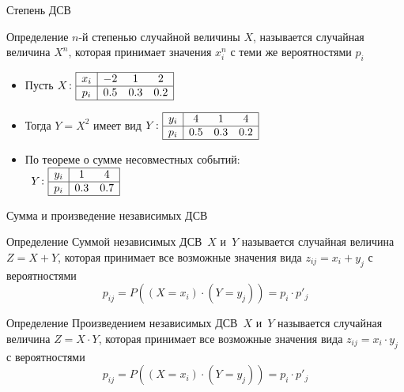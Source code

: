 \documentclass[unicode,11pt,notheorems,xcolor=table]{beamer}
\begin{document}
\begin{frame}{Степень  ДСВ}{}
    
    
     \begin{block}{Определение}
        \alert{$n$-й степенью} случайной величины $X$, называется случайная величина $X^n$, которая принимает значения $x_i^n$ с теми же вероятностями $p_i$
     \end{block}

    \bigskip

    \medskip
    \begin{itemize}
        \item Пусть \hfill
        $
        X\colon \begin{array}{|c|ccc|}
           \hline
            x_i & -2 & 1& 2 \\
            \hline
            p_i & 0.5 & 0.3 & 0.2 \\
            \hline
           \end{array}
        $
        \item Тогда $Y=X^2$ имеет вид\hfill
        $
       Y\colon \begin{array}{|c|ccc|}
           \hline
            y_i & 4 & 1& 4 \\
            \hline
            p_i & 0.5 & 0.3 & 0.2 \\
            \hline
           \end{array}
        $
        \item По теореме о сумме несовместных событий: 
        \\~\hfill$
       Y\colon \begin{array}{|c|cc|}
           \hline
            y_i &  1& 4 \\
            \hline
            p_i & 0.3 & 0.7 \\
            \hline
           \end{array}
        $

     \end{itemize}
\end{frame}


\begin{frame}{Сумма и произведение независимых ДСВ}{}
    \begin{block}{Определение}
        \alert{Суммой} независимых ДСВ~$X$ и~$Y$ называется случайная величина $Z=X+Y$, которая принимает все возможные значения вида $z_{ij} = x_i+y_j$ с вероятностями 
        $$
            p_{ij}=P( (X=x_i)\cdot(Y=y_j)) = p_i\cdot p'_j
        $$
     \end{block}


     \begin{block}{Определение}
        \alert{Произведением} независимых ДСВ~$X$ и~$Y$ называется случайная величина $Z=X \cdot Y$, которая принимает все возможные значения вида $z_{ij} = x_i \cdot y_j$ с вероятностями 
        $$
            p_{ij}=P( (X=x_i)\cdot(Y=y_j)) = p_i\cdot p'_j
        $$
     \end{block}
\end{frame}
\end{document}
